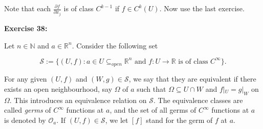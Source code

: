 \documentclass{book}
\begin{document}
Note that each $\frac{\partial f}{\partial x_j}$ is of class $C^{k-1}$ if $f \in C^k(U)$. Now use the last exercise.

\textbf{Exercise 38:}

Let $n \in \mathbb{N}$ and $a \in \mathbb{R}^n$. Consider the following set

\[
\mathcal{S} := \{(U,f) : a \in U \subseteq_{open} \mathbb{R}^n \text{ and } f : U \to \mathbb{R} \text{ is of class } C^{\infty}\}.
\]

For any given $(U,f)$ and $(W,g) \in \mathcal{S}$, we say that they are equivalent if there exists an open neighbourhood, say $\Omega$ of $a$ such that $\Omega \subseteq U \cap W$ and $f|_U = g|_W$ on $\Omega$. This introduces an equivalence relation on $\mathcal{S}$. The equivalence classes are called \textit{germs} of $C^{\infty}$ functions at $a$, and the set of all germs of $C^{\infty}$ functions at $a$ is denoted by $\mathcal{O}_a$. If $(U,f) \in \mathcal{S}$, we let $[f]$ stand for the germ of $f$ at $a$.
\end{document}
